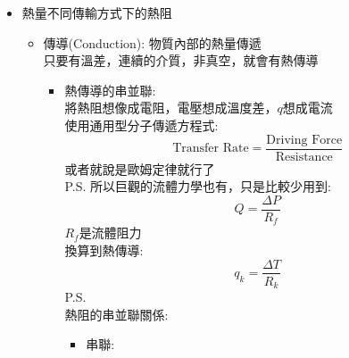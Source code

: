 \documentclass[../main.tex]{subfiles}
\begin{document}
\begin{itemize}
  \begin{itemize}
    \item Thermal Resistance 熱阻:
    \begin{equation}
      R = \frac{L}{kA}
    \end{equation}
    $L$是傳導距離，單位是$m$\\
    $k$是熱導係數，單位是$W/m\cdot K$\\
    $A$是傳導的面積，單位是$m^2$\\
    熱阻的單位是$K/W$
    \item 熱導效率是，溫差的驅動力除以熱阻
    \begin{equation}
      q = \frac{\Delta T}{R} = \frac{\text{Driving Force}}{\text{Resistance}}
    \end{equation}
    \item 熱擴散係數($\alpha$):
    \begin{equation}
      \alpha = \frac{k}{\rho \hat{C}_p}
    \end{equation}
  \end{itemize}
  \item 熱量不同傳輸方式下的熱阻
  \begin{itemize}
    \item 傳導(Conduction): 物質內部的熱量傳遞\\
    只要有溫差，連續的介質，非真空，就會有熱傳導
    \begin{itemize}
      \item 熱傳導的串並聯:\\
      將熱阻想像成電阻，電壓想成溫度差，$q$想成電流\\
      使用通用型分子傳遞方程式:
      \begin{equation}
        \text{Transfer Rate} = \frac{\text{Driving Force}}{\text{Resistance}}
      \end{equation}
      或者就說是歐姆定律就行了\\
      P.S. 所以巨觀的流體力學也有，只是比較少用到:
      \begin{equation}
        Q = \frac{\Delta P}{R_f}
      \end{equation}
      $R_f$是流體阻力\\
      換算到熱傳導:
      \begin{equation}
        q_k = \frac{\Delta T}{R_k}
      \end{equation}
      P.S. \\
      熱阻的串並聯關係:
      \begin{itemize}
        \item 串聯:

\end{itemize}
\end{itemize}
\end{itemize}
\end{itemize}
\end{document}
